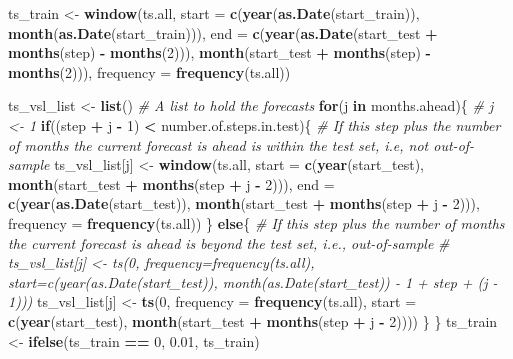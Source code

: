 \documentclass[
]{article}
\newenvironment{Shaded}{\begin{snugshade}}{\end{snugshade}}
\newcommand{\AttributeTok}[1]{\textcolor[rgb]{0.13,0.29,0.53}{#1}}
\newcommand{\CommentTok}[1]{\textcolor[rgb]{0.56,0.35,0.01}{\textit{#1}}}
\newcommand{\ControlFlowTok}[1]{\textcolor[rgb]{0.13,0.29,0.53}{\textbf{#1}}}
\newcommand{\DecValTok}[1]{\textcolor[rgb]{0.00,0.00,0.81}{#1}}
\newcommand{\FloatTok}[1]{\textcolor[rgb]{0.00,0.00,0.81}{#1}}
\newcommand{\FunctionTok}[1]{\textcolor[rgb]{0.13,0.29,0.53}{\textbf{#1}}}
\newcommand{\NormalTok}[1]{#1}
\newcommand{\OtherTok}[1]{\textcolor[rgb]{0.56,0.35,0.01}{#1}}
\newcommand{\SpecialCharTok}[1]{\textcolor[rgb]{0.81,0.36,0.00}{\textbf{#1}}}
\begin{document}
\begin{Shaded}
\begin{Highlighting}[]
\NormalTok{ts\_train }\OtherTok{\textless{}{-}} \FunctionTok{window}\NormalTok{(ts.all, }\AttributeTok{start =} \FunctionTok{c}\NormalTok{(}\FunctionTok{year}\NormalTok{(}\FunctionTok{as.Date}\NormalTok{(start\_train)), }\FunctionTok{month}\NormalTok{(}\FunctionTok{as.Date}\NormalTok{(start\_train))), }\AttributeTok{end =} \FunctionTok{c}\NormalTok{(}\FunctionTok{year}\NormalTok{(}\FunctionTok{as.Date}\NormalTok{(start\_test }\SpecialCharTok{+} \FunctionTok{months}\NormalTok{(step) }\SpecialCharTok{{-}} \FunctionTok{months}\NormalTok{(}\DecValTok{2}\NormalTok{))), }\FunctionTok{month}\NormalTok{(start\_test }\SpecialCharTok{+} \FunctionTok{months}\NormalTok{(step) }\SpecialCharTok{{-}} \FunctionTok{months}\NormalTok{(}\DecValTok{2}\NormalTok{))), }\AttributeTok{frequency =} \FunctionTok{frequency}\NormalTok{(ts.all))}

\NormalTok{  ts\_vsl\_list }\OtherTok{\textless{}{-}} \FunctionTok{list}\NormalTok{() }\CommentTok{\# A list to hold the forecasts}
  \ControlFlowTok{for}\NormalTok{(j }\ControlFlowTok{in}\NormalTok{ months.ahead)\{}
    \CommentTok{\# j \textless{}{-} 1}
    \ControlFlowTok{if}\NormalTok{((step }\SpecialCharTok{+}\NormalTok{ j }\SpecialCharTok{{-}} \DecValTok{1}\NormalTok{) }\SpecialCharTok{\textless{}}\NormalTok{ number.of.steps.in.test)\{ }\CommentTok{\# If this step plus the number of months the current forecast is ahead is within the test set, i.e, not out{-}of{-}sample}
\NormalTok{      ts\_vsl\_list[j] }\OtherTok{\textless{}{-}} \FunctionTok{window}\NormalTok{(ts.all, }\AttributeTok{start =} \FunctionTok{c}\NormalTok{(}\FunctionTok{year}\NormalTok{(start\_test), }\FunctionTok{month}\NormalTok{(start\_test }\SpecialCharTok{+} \FunctionTok{months}\NormalTok{(step }\SpecialCharTok{+}\NormalTok{ j }\SpecialCharTok{{-}} \DecValTok{2}\NormalTok{))), }\AttributeTok{end =} \FunctionTok{c}\NormalTok{(}\FunctionTok{year}\NormalTok{(}\FunctionTok{as.Date}\NormalTok{(start\_test)), }\FunctionTok{month}\NormalTok{(start\_test }\SpecialCharTok{+} \FunctionTok{months}\NormalTok{(step }\SpecialCharTok{+}\NormalTok{ j }\SpecialCharTok{{-}} \DecValTok{2}\NormalTok{))), }\AttributeTok{frequency =} \FunctionTok{frequency}\NormalTok{(ts.all)) }
\NormalTok{    \} }\ControlFlowTok{else}\NormalTok{\{ }\CommentTok{\# If this step plus the number of months the current forecast is ahead is beyond the test set, i.e., out{-}of{-}sample}
      \CommentTok{\# ts\_vsl\_list[j] \textless{}{-} ts(0, frequency=frequency(ts.all), start=c(year(as.Date(start\_test)), month(as.Date(start\_test)) {-} 1 + step + (j {-} 1)))}
\NormalTok{      ts\_vsl\_list[j] }\OtherTok{\textless{}{-}} \FunctionTok{ts}\NormalTok{(}\DecValTok{0}\NormalTok{, }\AttributeTok{frequency =} \FunctionTok{frequency}\NormalTok{(ts.all), }\AttributeTok{start =} \FunctionTok{c}\NormalTok{(}\FunctionTok{year}\NormalTok{(start\_test), }\FunctionTok{month}\NormalTok{(start\_test }\SpecialCharTok{+} \FunctionTok{months}\NormalTok{(step }\SpecialCharTok{+}\NormalTok{ j }\SpecialCharTok{{-}} \DecValTok{2}\NormalTok{))))}
\NormalTok{    \}}
\NormalTok{  \}}
\NormalTok{  ts\_train }\OtherTok{\textless{}{-}} \FunctionTok{ifelse}\NormalTok{(ts\_train }\SpecialCharTok{==} \DecValTok{0}\NormalTok{, }\FloatTok{0.01}\NormalTok{, ts\_train)}


\end{Highlighting}
\end{Shaded}
\end{document}
